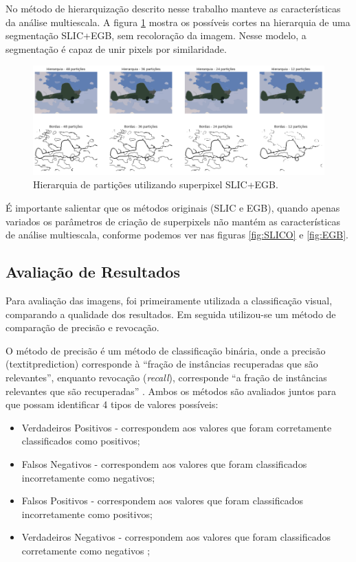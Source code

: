 \begin{document}
No método de hierarquização descrito nesse trabalho manteve as características da análise multiescala. A figura \ref{fig:hierarq_partit} mostra os possíveis cortes na hierarquia de uma segmentação SLIC+EGB, sem recoloração da imagem. Nesse modelo, a segmentação é capaz de unir pixels por similaridade.

\begin{figure}[ht]
\centering
\includegraphics[width=1.\textwidth]{slic_hierarquia_particoes.png}
\caption{Hierarquia de partições utilizando superpixel SLIC+EGB.}
\label{fig:hierarq_partit}
\end{figure}

É importante salientar que os métodos originais (SLIC e EGB), quando apenas variados os parâmetros de criação de superpixels não mantém as características de análise multiescala, conforme podemos ver nas figuras \ref{fig:SLICO} e \ref{fig:EGB}.


\subsection{Avaliação de Resultados} \label{ssec:aval_resultados}

Para avaliação das imagens, foi primeiramente utilizada a classificação visual, comparando a qualidade dos resultados. Em seguida utilizou-se um método de comparação de precisão e revocação.

O método de precisão é um método de classificação binária, onde a precisão (textit{prediction}) corresponde à ``fração de instâncias recuperadas que são relevantes'', enquanto revocação (\textit{recall}), corresponde ``a fração de instâncias relevantes que são recuperadas'' \cite{WIKI_PREC_RECALL}. Ambos os métodos são avaliados juntos para que possam identificar 4 tipos de valores possíveis:

\begin{itemize}
 \item Verdadeiros Positivos - correspondem aos valores que foram corretamente classificados como positivos;
 \item Falsos Negativos - correspondem aos valores que foram classificados incorretamente como negativos;
 \item Falsos Positivos - correspondem aos valores que foram classificados incorretamente como positivos;
 \item Verdadeiros Negativos - correspondem aos valores que foram classificados corretamente como negativos \cite{WIKI_PREC_RECALL};
\end{itemize}
\end{document}
